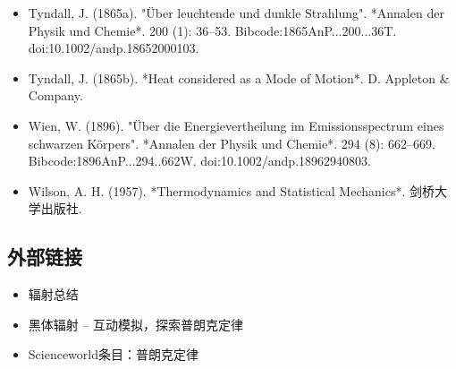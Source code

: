 \begin{itemize}
\item Tyndall, J. (1865a). "Über leuchtende und dunkle Strahlung". *Annalen der Physik und Chemie*. 200 (1): 36–53. Bibcode:1865AnP...200...36T. doi:10.1002/andp.18652000103.  
\item Tyndall, J. (1865b). *Heat considered as a Mode of Motion*. D. Appleton & Company.  
\item Wien, W. (1896). "Über die Energievertheilung im Emissionsspectrum eines schwarzen Körpers". *Annalen der Physik und Chemie*. 294 (8): 662–669. Bibcode:1896AnP...294..662W. doi:10.1002/andp.18962940803.  
\item Wilson, A. H. (1957). *Thermodynamics and Statistical Mechanics*. 剑桥大学出版社.
\end{itemize}
\subsection{外部链接}
\begin{itemize}
\item 辐射总结
\item 黑体辐射 – 互动模拟，探索普朗克定律
\item Scienceworld条目：普朗克定律
\end{itemize}